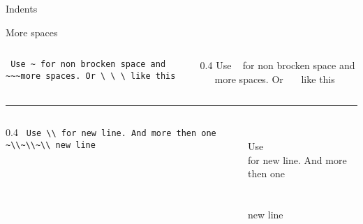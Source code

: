 \begin{frame}[fragile]{Indents}\relax
\cprotect{}
\end{frame}

\begin{frame}[fragile]{More spaces}\relax
\begin{columns}
\begin{column}{0.4\textwidth}
     \lstinline[basicstyle=\tt\normalsize]| Use ~ for non brocken space and ~~~more spaces. Or \ \ \ like this|
\end{column}
\begin{column}{0.4\textwidth}
     Use ~ for non brocken space and ~~~more spaces. Or \ \ \ like this
\end{column}
\end{columns}
\hrule
\begin{columns}
\begin{column}{0.4\textwidth}
     \lstinline[basicstyle=\tt\normalsize]| Use \\ for new line. And more then one ~\\~\\~\\ new line|
\end{column}
\begin{column}{0.4\textwidth}
~\\
     Use \\ for new line. And more then one ~\\~\\~\\ new line
\end{column}
\end{columns}

\end{frame}

